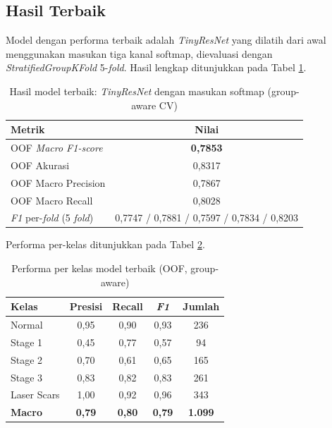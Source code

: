 \subsection{Hasil Terbaik}

Model dengan performa terbaik adalah \textit{TinyResNet} yang dilatih dari awal menggunakan
masukan tiga kanal softmap, dievaluasi dengan \textit{StratifiedGroupKFold} 5-\textit{fold}.
Hasil lengkap ditunjukkan pada Tabel \ref{tab:hasil_terbaik}.

\begin{table}[H]
\centering
\caption{Hasil model terbaik: \textit{TinyResNet} dengan masukan softmap (group-aware CV)}
\label{tab:hasil_terbaik}
\begin{tabular}{l c}
\toprule
\textbf{Metrik} & \textbf{Nilai} \\
\midrule
OOF \textit{Macro F1-score}        & \textbf{0,7853} \\
OOF Akurasi               & 0,8317 \\
OOF Macro Precision       & 0,7867 \\
OOF Macro Recall          & 0,8028 \\
\midrule
\textit{F1} per-\textit{fold} (5 \textit{fold}) & 0,7747 / 0,7881 / 0,7597 / 0,7834 / 0,8203 \\
\bottomrule
\end{tabular}
\end{table}

Performa per-kelas ditunjukkan pada Tabel \ref{tab:performa_per_kelas}.

\begin{table}[H]
\centering
\caption{Performa per kelas model terbaik (OOF, group-aware)}
\label{tab:performa_per_kelas}
\begin{tabular}{l c c c c}
\toprule
\textbf{Kelas} & \textbf{Presisi} & \textbf{Recall} & \textbf{\textit{F1}} & \textbf{Jumlah} \\
\midrule
Normal       & 0,95 & 0,90 & 0,93 & 236 \\
Stage 1      & 0,45 & 0,77 & 0,57 & 94  \\
Stage 2      & 0,70 & 0,61 & 0,65 & 165 \\
Stage 3      & 0,83 & 0,82 & 0,83 & 261 \\
Laser Scars  & 1,00 & 0,92 & 0,96 & 343 \\
\midrule
\textbf{Macro} & \textbf{0,79} & \textbf{0,80} & \textbf{0,79} & \textbf{1.099} \\
\bottomrule
\end{tabular}
\end{table}

